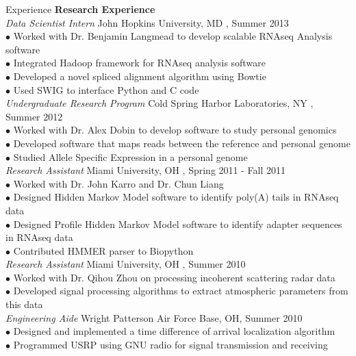 \documentclass{resume} %
\begin{document}
\begin{rSection}{Experience}
  \textbf{Research Experience}\\[1 mm]
  \textit{Data Scientist Intern} \hfill John Hopkins University, MD , Summer 2013 \\ [1 mm]
  $\bullet$ Worked with Dr. Benjamin Langmead to develop scalable RNAseq Analysis software \\
  $\bullet$ Integrated Hadoop framework for RNAseq analysis software \\
  $\bullet$ Developed a novel spliced alignment algorithm using Bowtie \\
  $\bullet$ Used SWIG to interface Python and C code \\[3 mm]
  \textit{Undergraduate Research Program} \hfill Cold Spring Harbor Laboratories, NY , Summer 2012 \\ [1 mm]
  $\bullet$ Worked with Dr. Alex Dobin to develop software to study personal genomics\\
  $\bullet$ Developed software that maps reads between the reference and personal genome \\
  $\bullet$ Studied Allele Specific Expression in a personal genome \\[3 mm]
  \textit{Research Assistant} \hfill Miami University, OH , Spring 2011 - Fall 2011 \\ [1 mm]
  $\bullet$ Worked with Dr. John Karro and Dr. Chun Liang\\
  $\bullet$ Designed Hidden Markov Model software to identify poly(A) tails in RNAseq data\\
  $\bullet$ Designed Profile Hidden Markov Model software to identify adapter sequences in RNAseq data\\
  $\bullet$ Contributed HMMER parser to Biopython\\[20 mm]
  \textit{Research Assistant} \hfill Miami University, OH , Summer 2010 \\ [1 mm]
  $\bullet$ Worked with Dr. Qihou Zhou on processing incoherent scattering radar data\\
  $\bullet$ Developed signal processing algorithms to extract atmospheric parameters from this data\\[3 mm]
  \textit{Engineering Aide} \hfill Wright Patterson Air Force Base, OH, Summer 2010 \\ [1 mm]
  $\bullet$ Designed and implemented a time difference of arrival localization algorithm \\
  $\bullet$ Programmed USRP using GNU radio for signal transmission and receiving \\[3 mm]

\end{rSection}
\end{document}
